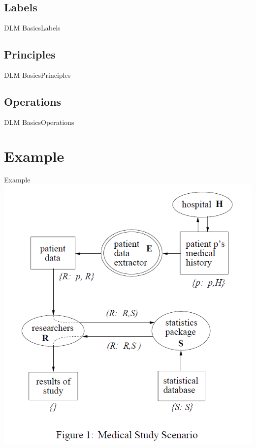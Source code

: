 \documentclass[10pt]{beamer}
\begin{document}
\subsection{Labels}
\begin{frame}{DLM Basics}{Labels}
	
\end{frame}

\subsection{Principles}
\begin{frame}{DLM Basics}{Principles}
	
\end{frame}

\subsection{Operations}
\begin{frame}{DLM Basics}{Operations}
\end{frame}

\section{Example}
\begin{frame}{Example}{}
	\centering
	\includegraphics[height=.7\paperheight]{hospital_example.png}
\end{frame}
\end{document}
